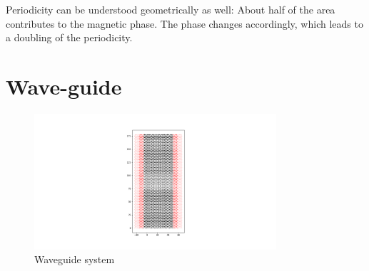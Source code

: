 Periodicity can be understood geometrically as well: About half of the area contributes to the magnetic phase. The phase changes accordingly, which leads to a doubling of the periodicity.

\section{Wave-guide}

\begin{figure}
\centering
\includegraphics[width=0.8\textwidth]{figure/numericalmodel/waveguide}
\caption{Waveguide system}\label{fig:waveguide-system}
\end{figure}

